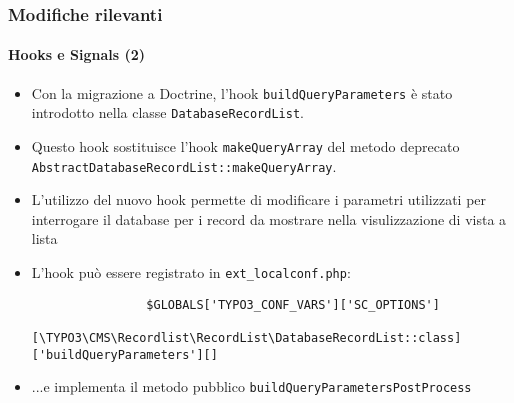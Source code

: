 \begin{frame}[fragile]
	\frametitle{Modifiche rilevanti}
	\framesubtitle{Hooks e Signals (2)}

	\lstset{basicstyle=\tiny\ttfamily}

	\begin{itemize}

		\item Con la migrazione a Doctrine, l'hook \texttt{buildQueryParameters} è stato introdotto nella classe
			\texttt{DatabaseRecordList}.

		\item Questo hook sostituisce l'hook \texttt{makeQueryArray} del metodo deprecato
			\texttt{AbstractDatabaseRecordList::makeQueryArray}.

		\item L'utilizzo del nuovo hook permette di modificare i parametri utilizzati per interrogare il database
			per i record da mostrare nella visulizzazione di vista a lista

		\item L'hook può essere registrato in \texttt{ext\_localconf.php}:

			\begin{lstlisting}
				$GLOBALS['TYPO3_CONF_VARS']['SC_OPTIONS']
				  [\TYPO3\CMS\Recordlist\RecordList\DatabaseRecordList::class]['buildQueryParameters'][]
			\end{lstlisting}

		\item ...e implementa il metodo pubblico \texttt{buildQueryParametersPostProcess}

	\end{itemize}

\end{frame}

